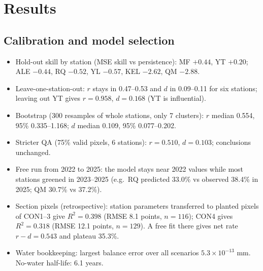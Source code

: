 \documentclass[11pt,a4paper]{article}
\begin{document}
\section{Results}

\subsection{Calibration and model selection}
\begin{table}[H]\centering\small
{}
\caption{Fits in units of $x=V/K$. Adding the wind-damage term worsens AIC and hold-out error and the
uncertainty of $k$ exceeds its value, so the term was removed (Section~\ref{sec:wind}; all 18 tests in \texttt{wind\_term\_test.csv}).}
\label{tab:fit}
\end{table}
\begin{itemize}
\item Hold-out skill by station (MSE skill vs persistence): MF $+0.44$, YT $+0.20$; ALE $-0.44$, RQ $-0.52$, YL $-0.57$, KEL $-2.62$, QM $-2.88$.
\item Leave-one-station-out: $r$ stays in 0.47--0.53 and $d$ in 0.09--0.11 for six stations; leaving out YT gives $r=0.958$, $d=0.168$ (YT is influential).
\item Bootstrap (300 resamples of whole stations, only 7 clusters): $r$ median 0.554, 95\% 0.335--1.168; $d$ median 0.109, 95\% 0.077--0.202.
\item Stricter QA (75\% valid pixels, 6 stations): $r=0.510$, $d=0.103$; conclusions unchanged.
\item Free run from 2022 to 2025: the model stays near 2022 values while most stations greened in 2023--2025
(e.g.\ RQ predicted 33.0\% vs observed 38.4\% in 2025; QM 30.7\% vs 37.2\%).
\item Section pixels (retrospective): station parameters transferred to planted pixels of CON1--3 give $R^2=0.398$
(RMSE 8.1 points, $n=116$); CON4 gives $R^2=0.318$ (RMSE 12.1 points, $n=129$). A free fit there gives net rate $r-d=0.543$ and plateau 35.3\%.
\item Water bookkeeping: largest balance error over all scenarios $5.3\times10^{-13}$ mm. No-water half-life: 6.1 years.
\end{itemize}
\end{document}
